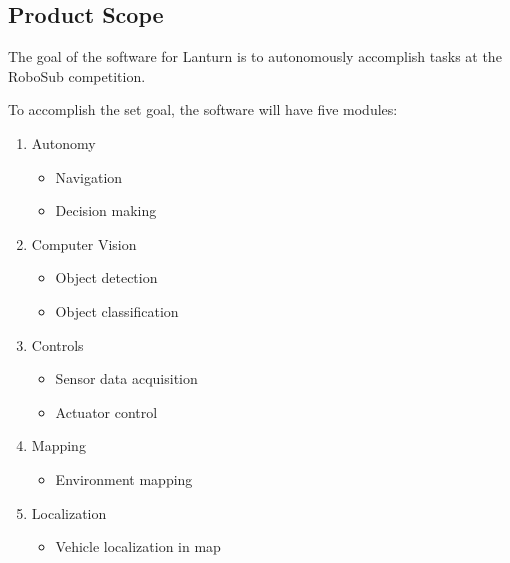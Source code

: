 \subsection{Product Scope}
\label{sec:scope}
The goal of the software for Lanturn is to autonomously accomplish tasks at the
RoboSub competition. 
\par

To accomplish the set goal, the software will have five modules: 
\begin{enumerate}
    \item Autonomy
        \begin{itemize}
            \item Navigation 
            \item Decision making 
        \end{itemize}

    \item Computer Vision 
        \begin{itemize}
            \item Object detection 
            \item Object classification
        \end{itemize}

    \item Controls 
        \begin{itemize}
            \item Sensor data acquisition 
            \item Actuator control
        \end{itemize}

    \item Mapping 
        \begin{itemize}
            \item Environment mapping 
        \end{itemize}

    \item Localization 
        \begin{itemize}
            \item Vehicle localization in map
        \end{itemize}
\end{enumerate}

